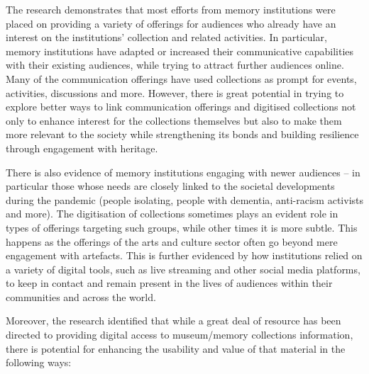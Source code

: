 \documentclass{egpubl}
\begin{document}
The research demonstrates that most efforts from memory institutions were placed on providing a variety of offerings for audiences who already have an interest on the institutions' collection and related activities. In particular, memory institutions have adapted or increased  their communicative capabilities with their existing audiences, while trying to attract further audiences online. Many of the communication offerings have used collections as prompt for events, activities, discussions and more. However, there is great potential in trying to explore better ways to link communication offerings and digitised collections not only to enhance interest for the collections themselves but also to make them more relevant to the society while strengthening its bonds and  building resilience through engagement with heritage.
 
There is also evidence of memory institutions engaging with newer audiences – in particular those whose needs are closely linked to the societal developments during the pandemic (people isolating, people with dementia, anti-racism activists and more). The digitisation of collections sometimes plays an evident role in types of offerings targeting such groups, while other times it is more subtle. This happens as the offerings of the arts and culture sector often go beyond mere engagement with artefacts. This is further evidenced by how institutions relied on a variety of digital tools, such as live streaming and other social media platforms, to keep in contact and remain present in the lives of audiences within their communities and across the world.
 
Moreover, the research identified that while a great deal of resource has been directed to providing digital access to museum/memory collections information, there is potential for enhancing the usability and value of that material in the following ways:
\end{document}
